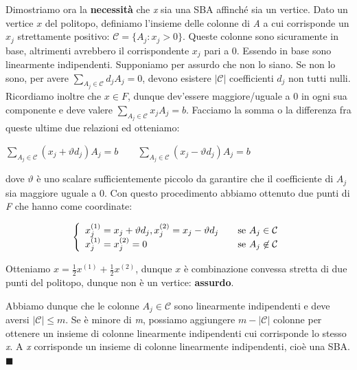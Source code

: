 \documentclass[11pt, oneside]{book}
\begin{document}
Dimostriamo ora la {\bf necessit\`a} che {\em x} sia una SBA
affinch\'e sia un vertice. Dato un vertice $x$ del politopo, definiamo
l'insieme delle colonne di {\em A} a cui corrisponde un $x_j$
strettamente positivo: $\mathcal{C} = \{ A_j : x_j > 0\}$. Queste
colonne sono sicuramente in base, altrimenti avrebbero il
corrispondente $x_j$ pari a 0. Essendo in base sono linearmente
indipendenti. Supponiamo per assurdo che non lo siano. Se non lo sono,
per avere $\sum\limits_{A_j \in \mathcal{C}} d_jA_j = 0$, devono
esistere $|\mathcal{C}|$ coefficienti $d_j$ non tutti
nulli. Ricordiamo inoltre che $x \in F$, dunque dev'essere maggiore/uguale a
0 in ogni sua componente e deve valere $\sum\limits_{A_j \in
  \mathcal{C}}x_jA_j = b$. Facciamo la somma o la differenza fra queste ultime
due relazioni ed otteniamo:

\begin{center}
$\sum\limits_{A_j \in \mathcal{C}} (x_j+\vartheta d_j)A_j = b \qquad
  \sum\limits_{A_j \in \mathcal{C}} (x_j-\vartheta d_j)A_j = b$
\end{center}

dove $\vartheta$ \`e uno scalare sufficientemente piccolo da garantire
che il coefficiente di $A_j$ sia maggiore uguale a 0. Con questo
procedimento abbiamo ottenuto due punti di {\em F} che hanno come
coordinate:

\begin{center}
\[\left\{
  \begin{array}{l l}
    x_j^{(1)} = x_j + \vartheta d_j, x_j^{(2)} = x_j - \vartheta d_j &
    \quad \text{se $A_j \in \mathcal{C}$}\\
    x_j^{(1)} = x_j^{(2)} = 0& \quad \text{se $A_j \not\in\mathcal{C}$}\\
  \end{array} \right.\]
\end{center}

Otteniamo $x = \frac{1}{2}x^{(1)} + \frac{1}{2}x^{(2)}$, dunque $x$
\`e combinazione convessa stretta di due punti del politopo, dunque
non \`e un vertice: {\bf assurdo}.

Abbiamo dunque che le colonne $A_j \in \mathcal{C}$ sono linearmente
indipendenti e deve aversi $|\mathcal{C}|\leq m$. Se \`e minore di
{\em m}, possiamo aggiungere $m-|\mathcal{C}|$ colonne per ottenere un
insieme di colonne linearmente indipendenti cui corrisponde lo stesso
{\em x}. A {\em x} corrisponde un insieme di colonne linearmente
indipendenti, cio\`e una SBA. $\blacksquare$

\par\bigskip
\end{document}
